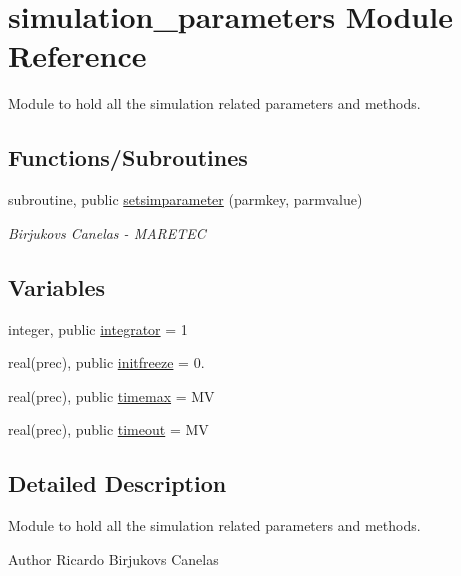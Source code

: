 \hypertarget{namespacesimulation__parameters}{}\section{simulation\+\_\+parameters Module Reference}
\label{namespacesimulation__parameters}


Module to hold all the simulation related parameters and methods.  


\subsection*{Functions/\+Subroutines}
\begin{DoxyCompactItemize}
\item 
subroutine, public \mbox{\hyperlink{namespacesimulation__parameters_af905a4701f68f0ad0a50606101fda7d6}{setsimparameter}} (parmkey, parmvalue)
\begin{DoxyCompactList}\small\item\em Birjukovs Canelas -\/ M\+A\+R\+E\+T\+EC \end{DoxyCompactList}\end{DoxyCompactItemize}
\subsection*{Variables}
\begin{DoxyCompactItemize}
\item 
integer, public \mbox{\hyperlink{namespacesimulation__parameters_a0a398ad974eef004e43a347105e8ad81}{integrator}} = 1
\item 
real(prec), public \mbox{\hyperlink{namespacesimulation__parameters_add65346bea9045d3ea4573be190f7cdc}{initfreeze}} = 0.
\item 
real(prec), public \mbox{\hyperlink{namespacesimulation__parameters_aedd90d7d1a6db61fcac836ac37034e75}{timemax}} = MV
\item 
real(prec), public \mbox{\hyperlink{namespacesimulation__parameters_a70ee14718c33544ce34bf7990211e5cc}{timeout}} = MV
\end{DoxyCompactItemize}


\subsection{Detailed Description}
Module to hold all the simulation related parameters and methods. 

\begin{DoxyAuthor}{Author}
Ricardo Birjukovs Canelas 
\end{DoxyAuthor}


